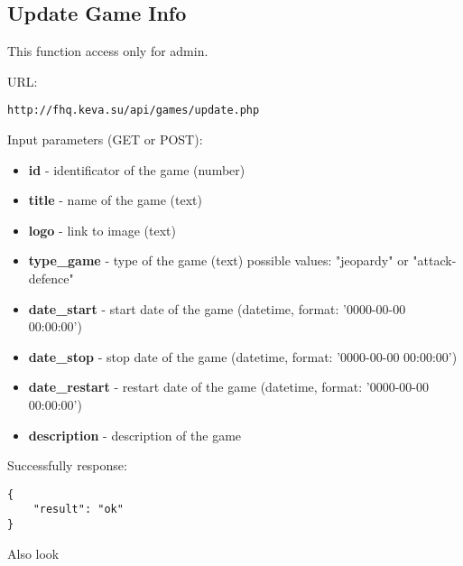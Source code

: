 \subsection{Update Game Info}
\par

This function access only for admin.

URL:
\begin{Verbatim}[frame=single]
http://fhq.keva.su/api/games/update.php
\end{Verbatim}

Input parameters (GET or POST):
\begin{itemize}
  \item \textbf{id} - identificator of the game (number)
  \item \textbf{title} - name of the game (text)
  \item \textbf{logo} - link to image (text)
  \item \textbf{type\_game} - type of the game (text) possible values: "jeopardy" or "attack-defence"
  \item \textbf{date\_start} - start date of the game (datetime, format:  '0000-00-00 00:00:00')
  \item \textbf{date\_stop} - stop date of the game (datetime, format:  '0000-00-00 00:00:00')
  \item \textbf{date\_restart} - restart date of the game (datetime, format:  '0000-00-00 00:00:00')
  \item \textbf{description} - description of the game
\end{itemize}

Successfully response:  \\
\begin{Verbatim}[frame=single]
{
    "result": "ok"
}
\end{Verbatim}

Also look ~
